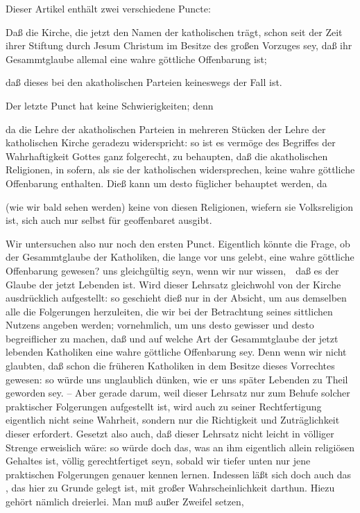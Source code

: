 \begin{aufza}
\item Dieser Artikel enthält zwei verschiedene Puncte:
\begin{aufzb}
\item Daß die Kirche, die jetzt den Namen der katholischen trägt, schon seit der Zeit ihrer Stiftung durch Jesum Christum im Besitze des großen Vorzuges sey, daß ihr Gesammtglaube allemal eine wahre göttliche Offenbarung ist;
\item daß dieses bei den akatholischen Parteien keineswegs der Fall ist.
\end{aufzb}
\item Der letzte Punct hat keine Schwierigkeiten; denn
\begin{aufzb}
\item da die Lehre der akatholischen Parteien in mehreren Stücken der Lehre der katholischen Kirche geradezu widerspricht: so ist es vermöge des Begriffes der Wahrhaftigkeit Gottes ganz folgerecht, zu behaupten, daß die akatholischen Religionen, in sofern, als sie der katholischen widersprechen, keine wahre göttliche Offenbarung enthalten. Dieß kann um desto füglicher behauptet werden, da
\item (wie wir bald sehen werden) keine von diesen Religionen, wiefern sie Volksreligion ist, sich auch nur selbst für geoffenbaret ausgibt.
\end{aufzb}
\item Wir untersuchen also nur noch den ersten Punct. Eigentlich könnte die Frage, ob der Gesammtglaube der Katholiken, die lange vor uns gelebt, eine wahre göttliche Offenbarung gewesen? uns gleichgültig seyn, wenn wir nur wissen,~\ daß es der Glaube der jetzt Lebenden ist. Wird dieser Lehrsatz gleichwohl von der Kirche ausdrücklich aufgestellt: so geschieht dieß nur in der Absicht, um aus demselben alle die Folgerungen herzuleiten, die wir bei der Betrachtung seines sittlichen Nutzens angeben werden; vornehmlich, um uns desto gewisser und desto begreiflicher zu machen, daß und auf welche Art der Gesammtglaube der jetzt lebenden Katholiken eine wahre göttliche Offenbarung sey. Denn wenn wir nicht glaubten, daß schon die früheren Katholiken in dem Besitze dieses Vorrechtes gewesen: so würde uns unglaublich dünken, wie er uns später Lebenden zu Theil geworden sey. -- Aber gerade darum, weil dieser Lehrsatz nur zum Behufe solcher praktischer Folgerungen aufgestellt ist, wird auch zu seiner Rechtfertigung eigentlich nicht seine  Wahrheit, sondern nur die Richtigkeit und Zuträglichkeit dieser  erfordert. Gesetzt also auch, daß dieser Lehrsatz nicht leicht in völliger Strenge erweislich wäre: so würde doch das, was an ihm eigentlich allein religiösen Gehaltes ist, völlig gerechtfertiget seyn, sobald wir tiefer unten nur jene praktischen Folgerungen genauer kennen lernen. Indessen läßt sich doch auch das , das hier zu Grunde gelegt ist, mit großer Wahrscheinlichkeit darthun. Hiezu gehört nämlich dreierlei. Man muß außer Zweifel setzen,

\end{aufza}
